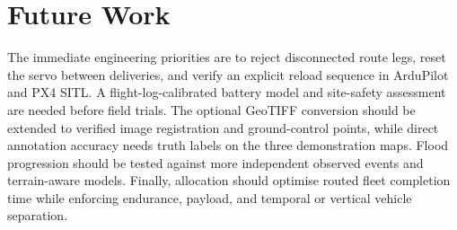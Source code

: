 \section{Future Work}
\label{sec:future}
The immediate engineering priorities are to reject disconnected route legs, reset the servo between deliveries, and verify an explicit reload sequence in ArduPilot and PX4 SITL. A flight-log-calibrated battery model and site-safety assessment are needed before field trials. The optional GeoTIFF conversion should be extended to verified image registration and ground-control points, while direct annotation accuracy needs truth labels on the three demonstration maps. Flood progression should be tested against more independent observed events and terrain-aware models. Finally, allocation should optimise routed fleet completion time while enforcing endurance, payload, and temporal or vertical vehicle separation.
